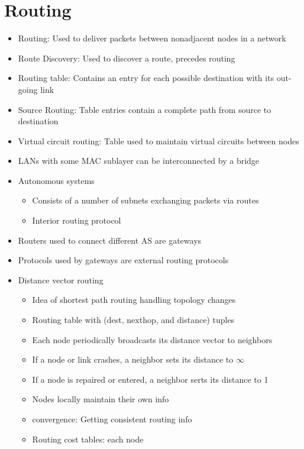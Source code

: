 \documentclass{article}
\begin{document}
    \section{Routing}
    \begin{itemize}
        \item Routing: Used to deliver packets between nonadjacent nodes in a network
        \item Route Discovery: Used to discover a route, precedes routing
        \item Routing table: Contains an entry for each possible destination with its out-going link
        \item Source Routing: Table entries contain a complete path from source to destination
        \item Virtual circuit routing: Table used to maintain virtual circuits between nodes
        \item LANs with some MAC sublayer can be interconnected by a bridge
        \item Autonomous systems
        \begin{itemize}
            \item Consists of a number of subnets exchanging packets via routes
            \item Interior routing protocol
        \end{itemize}
        \item Routers used to connect different AS are gateways
        \item Protocols used by gateways are external routing protocols
        \item Distance vector routing
        \begin{itemize}
            \item Idea of shortest path routing handling topology changes
            \item Routing table with (dest, nexthop, and distance) tuples
            \item Each node periodically broadcasts its distance vector to neighbors
            \item If a node or link crashes, a neighbor sets its distance to $\infty$
            \item If a node is repaired or entered, a neighbor serts its distance to 1
            \item Nodes locally maintain their own info
            \item convergence: Getting consistent routing info
            \item Routing cost tables: each node

\end{itemize}
\end{itemize}
\end{document}

